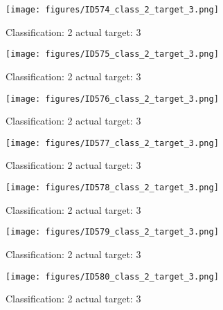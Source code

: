 \begin{figure}[h!]
\begin{center}
\texttt{[image: figures/ID574\_class\_2\_target\_3.png]}
\end{center}
\caption{ Classification: 2 actual target: 3}
\label{fig:ID574_class_2_target_3}
\end{figure}
\begin{figure}[h!]
\begin{center}
\texttt{[image: figures/ID575\_class\_2\_target\_3.png]}
\end{center}
\caption{ Classification: 2 actual target: 3}
\label{fig:ID575_class_2_target_3}
\end{figure}
\begin{figure}[h!]
\begin{center}
\texttt{[image: figures/ID576\_class\_2\_target\_3.png]}
\end{center}
\caption{ Classification: 2 actual target: 3}
\label{fig:ID576_class_2_target_3}
\end{figure}
\begin{figure}[h!]
\begin{center}
\texttt{[image: figures/ID577\_class\_2\_target\_3.png]}
\end{center}
\caption{ Classification: 2 actual target: 3}
\label{fig:ID577_class_2_target_3}
\end{figure}
\begin{figure}[h!]
\begin{center}
\texttt{[image: figures/ID578\_class\_2\_target\_3.png]}
\end{center}
\caption{ Classification: 2 actual target: 3}
\label{fig:ID578_class_2_target_3}
\end{figure}
\begin{figure}[h!]
\begin{center}
\texttt{[image: figures/ID579\_class\_2\_target\_3.png]}
\end{center}
\caption{ Classification: 2 actual target: 3}
\label{fig:ID579_class_2_target_3}
\end{figure}
\begin{figure}[h!]
\begin{center}
\texttt{[image: figures/ID580\_class\_2\_target\_3.png]}
\end{center}
\caption{ Classification: 2 actual target: 3}
\label{fig:ID580_class_2_target_3}
\end{figure}
